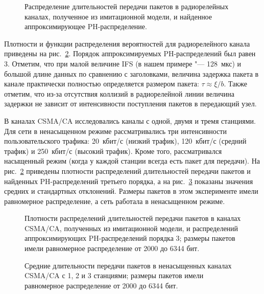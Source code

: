 \begin{figure}[h]
  \caption{Распределение длительностей передачи пакетов в радиорелейных каналах, полученное из имитационной модели, и найденное аппроксимирующее PH-распределение.}
  \label{fig:ch4_fitting_relay_delays}
\end{figure}

Плотности и функции распределения вероятностей для радиорелейного канала приведены на рис.~\ref{fig:ch4_fitting_dcf_delays}. Порядок аппроксимируемых PH-распределений был равен 3. Отметим, что при малой величине IFS (в нашем примере "--- 128~мкс) и большой длине данных по сравнению с заголовками, величина задержка пакета в канале практически полностью определяется размером пакета: $\tau \approx \xi / b$. Также отметим, что из-за отсутствия коллизий в радиорелейной линии величина задержки не зависит от интенсивности поступления пакетов в передающий узел.

В каналах CSMA/CA исследовались каналы с одной, двумя и тремя станциями. Для сети в ненасыщенном режиме рассматривались три интенсивности пользовательского трафика: 20~кбит/с (низкий трафик), 120~кбит/с (средний трафик) и 250~кбит/с (высокий трафик). Кроме того, рассматривался насыщенный режим (когда у каждой станции всегда есть пакет для передачи). На рис.~\ref{fig:ch4_fitting_dcf_delays} приведены плотности распределений длительностей передачи пакетов и найденных PH-распределений третьего порядка, а на рис.~\ref{fig:ch4_fitting_dcf_means_123} показаны значения средних и стандартных отклонений. Размеры пакетов в этом эксперименте имели равномерное распределение, а сеть работала в ненасыщенном режиме.

\begin{figure}[h]
  \caption{Плотности распределений длительностей передачи пакетов в каналах CSMA/CA, полученных из имитационной модели, и распределений аппроксимирующих PH-распределений порядка 3; размеры пакетов имели равномерное распределение от 2000 до 6344 бит.}
  \label{fig:ch4_fitting_dcf_delays}
\end{figure}

\begin{figure}[h]
  \caption{Средние длительности передачи пакетов в ненасыщенных каналах CSMA/CA с 1, 2 и 3 станциями; размеры пакетов имели равномерное распределение от 2000 до 6344 бит.}
  \label{fig:ch4_fitting_dcf_means_123}
\end{figure}

